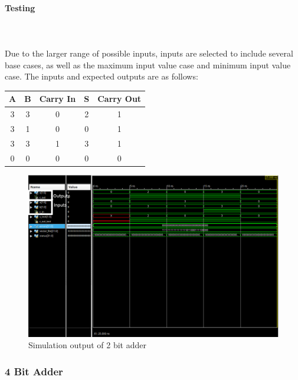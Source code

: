 \documentclass{article}
\begin{document}
    \paragraph{Testing}
    \hfill\\\\
    Due to the larger range of possible inputs, inputs are selected to include
    several base cases, as well as the maximum input value case and minimum
    input value case. The inputs and expected outputs are as follows:

    \begin{center}
        \begin{tabular}{|c|c|c||c|c|}
            \hline
            A & B & Carry In & S & Carry Out
            \\\hline\hline
            3 & 3 & 0 & 2 & 1
            \\\hline\hline
            3 & 1 & 0 & 0 & 1
            \\\hline\hline
            3 & 3 & 1 & 3 & 1
            \\\hline\hline
            0 & 0 & 0 & 0 & 0
            \\\hline
        \end{tabular}
    \end{center}

    \begin{figure}[H]
        \centering
        \includegraphics[width=0.9\paperwidth,center]{Screenshots/adder_2.png}
        \caption{Simulation output of 2 bit adder}
    \end{figure}




    \subsubsection{4 Bit Adder}
\end{document}

